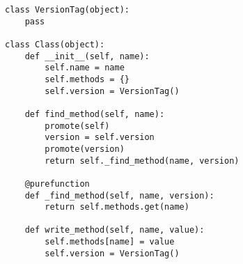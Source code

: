 \begin{lstlisting}[mathescape,basicstyle=\ttfamily]
class VersionTag(object):
    pass

class Class(object):
    def __init__(self, name):
        self.name = name
        self.methods = {}
        self.version = VersionTag()

    def find_method(self, name):
        promote(self)
        version = self.version
        promote(version)
        return self._find_method(name, version)

    @purefunction
    def _find_method(self, name, version):
        return self.methods.get(name)

    def write_method(self, name, value):
        self.methods[name] = value
        self.version = VersionTag()
\end{lstlisting}

